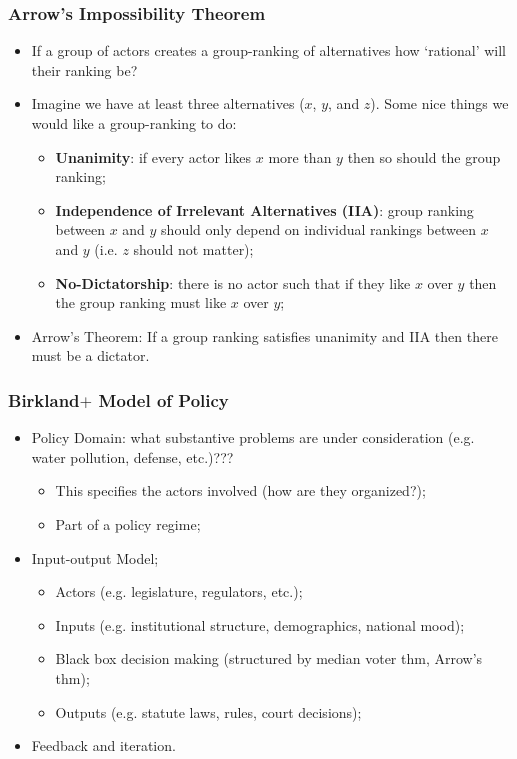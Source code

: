 \documentclass[aspectratio=169]{beamer}
\theoremstyle{principle}
\begin{document}
\begin{frame}
\frametitle{Arrow's Impossibility Theorem}
\begin{itemize}
\item If a group of actors creates a group-ranking of alternatives how `rational' will their ranking be?
\bigskip
\bigskip
\item Imagine we have at least three alternatives ($x$, $y$, and $z$).  Some nice things we would like a group-ranking to do:
\begin{itemize}
\item \textbf{Unanimity}: if every actor likes $x$ more than $y$ then so should the group ranking;
\item \textbf{Independence of Irrelevant Alternatives (IIA)}: group ranking between $x$ and $y$ should only depend on individual rankings between $x$ and $y$ (i.e. $z$ should not matter);
\item \textbf{No-Dictatorship}: there is no actor such that if they like $x$ over $y$ then the group ranking must like $x$ over $y$;
\end{itemize}
\bigskip
\bigskip
\item Arrow's Theorem: If a group ranking satisfies unanimity and IIA then there must be a dictator.
\end{itemize}
\end{frame}



\begin{frame}
\frametitle{Birkland$+$ Model of Policy}
\begin{itemize}
\item[] \color{white}Policy Domain: what substantive problems are under consideration (e.g. water pollution, defense, etc.)???
\begin{itemize}
\item[] \color{white}This specifies the actors involved (how are they organized?);
\item[] \color{white}Part of a policy regime;
\end{itemize}
\bigskip
\item \color{black}Input-output Model;
\begin{itemize}
\item Actors (e.g. legislature, regulators, etc.);
\item Inputs (e.g. institutional structure, demographics, national mood);
\item Black box decision making (structured by median voter thm, Arrow's thm);
\item Outputs (e.g. statute laws, rules, court decisions);
\end{itemize}
\bigskip
\item[] \color{white}Feedback and iteration.
\end{itemize}
\end{frame}
\end{document}
